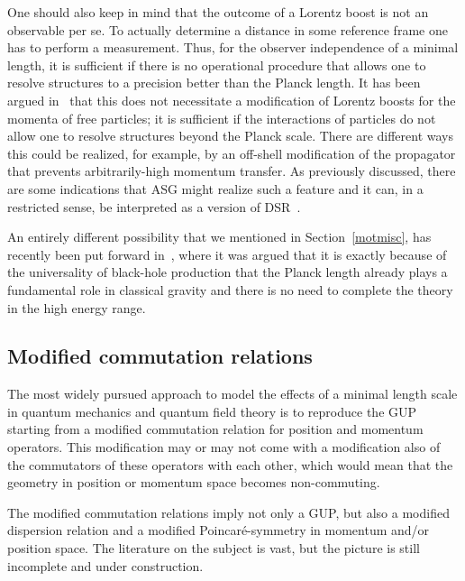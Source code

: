 \documentclass{article}
\begin{document}
One should also keep in mind that the outcome of a Lorentz boost is not an observable per se.
To actually determine a distance in some reference frame one has to perform a
measurement. Thus, for the observer independence of a minimal length, it is sufficient if 
there is no operational procedure that allows one to resolve structures to a precision better
than the Planck length. It has been argued in~\cite{Hossenfelder:2006cw} that this does
not necessitate a modification of Lorentz boosts for the momenta of free particles; it is
sufficient if the interactions of particles do not allow one to resolve structures beyond
the Planck scale. There are different ways this could be realized, for example, by an
off-shell modification of the propagator that prevents arbitrarily-high momentum transfer.
As previously discussed, there are some indications that {\sc ASG} might realize such a feature
and it can, in a restricted sense, be interpreted as a version of {\sc DSR}~\cite{Calmet:2010tx}.

An entirely different possibility that we mentioned in Section~\ref{motmisc}, has 
recently been put forward in~\cite{Dvali:2010bf,Dvali:2010ue}, where it was argued that it is exactly because of the
universality of black-hole production that the Planck length already plays a fundamental role in classical 
gravity and there is no need to complete the theory in the high energy range. 


\subsection{Modified commutation relations}
\label{mcr}

The most widely pursued approach to model the effects of a minimal length scale in quantum mechanics
and quantum field theory is to reproduce the GUP 
 starting from a modified commutation relation for position
and momentum operators. This modification may or may not come with a modification also of the commutators of
these operators with each other, which would mean that the geometry in position or momentum space becomes
non-commuting. 

The modified commutation relations imply not only a {\sc GUP},
but also a modified dispersion relation and a modified Poincar\'e-symmetry in momentum
and/or position space. The literature on the subject is vast, but the picture is still incomplete and under construction.
\end{document}
